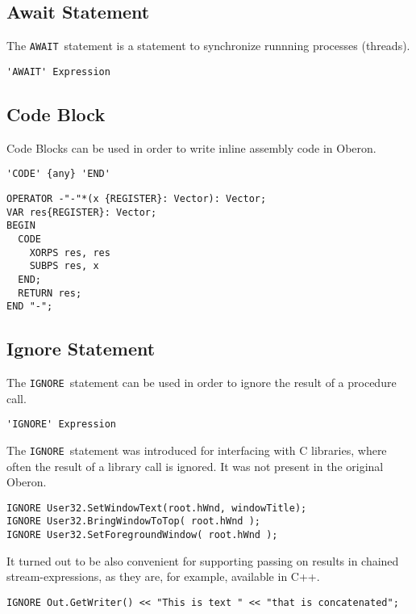 \documentclass[a4wide,11pt]{article}
\newcommand{\AWAIT}{\lstinline"AWAIT"}
\newcommand{\IGNORE}{\lstinline"IGNORE"}
\begin{document}
\subsection{Await Statement}
The \AWAIT\ statement is a statement to synchronize runnning processes (threads).

\begin{lstlisting}[style=ebnf]
'AWAIT' Expression
\end{lstlisting}


\subsection{Code Block}
Code Blocks can be used in order to write inline assembly code in Oberon.
\begin{lstlisting}[style=ebnf]
'CODE' {any} 'END'
\end{lstlisting}

\begin{annotation}
\begin{lstlisting}[style=example]
OPERATOR -"-"*(x {REGISTER}: Vector): Vector;
VAR res{REGISTER}: Vector;
BEGIN
  CODE
    XORPS res, res
    SUBPS res, x
  END;
  RETURN res;
END "-";
\end{lstlisting}
\end{annotation}

\subsection{Ignore Statement}
The \IGNORE\ statement can be used in order to ignore the result of a procedure call.

\begin{lstlisting}[style=ebnf]
'IGNORE' Expression
\end{lstlisting}

\begin{annotation}
The \IGNORE\ statement was introduced for interfacing with C libraries, where often the result of a library call is ignored.
It was not present in the original Oberon.

\begin{lstlisting}[style=example]
IGNORE User32.SetWindowText(root.hWnd, windowTitle);
IGNORE User32.BringWindowToTop( root.hWnd );
IGNORE User32.SetForegroundWindow( root.hWnd );
\end{lstlisting}

It turned out to be also convenient for supporting passing on results in chained stream-expressions, as they are, for example, available in C++.
\begin{lstlisting}[style=example]
IGNORE Out.GetWriter() << "This is text " << "that is concatenated";
\end{lstlisting}

\end{annotation}
\end{document}

